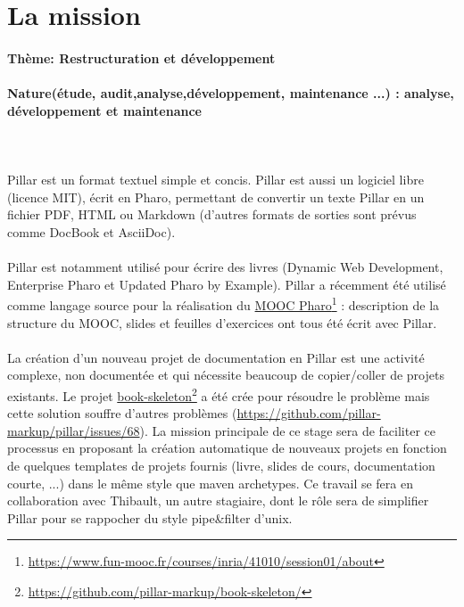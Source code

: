 \documentclass[french,twoside,openany,showtrims]{root/support/latex/sbabook/sbabook}
\newcommand\hrefnote[3][]{%
  \href{#2}{#3}\footnote{\url{#2} #1}}
\begin{document}
    \section{La mission}
      \paragraph{Thème: Restructuration et développement}

      \paragraph{Nature(étude, audit,analyse,développement, maintenance ...) : analyse, développement et maintenance}

      ~~\\
      ~~\\

      Pillar est un format textuel simple et concis. Pillar est aussi un logiciel
      libre (licence MIT), écrit en Pharo, permettant de convertir un texte Pillar
      en un fichier PDF, HTML ou Markdown (d'autres formats de sorties sont prévus
      comme DocBook et AsciiDoc).\\

      ~~\\

      Pillar est notamment utilisé pour écrire des livres (Dynamic Web Development,
      Enterprise Pharo et Updated Pharo by Example). Pillar a récemment été utilisé
      comme langage source pour la réalisation du \hrefnote{https://www.fun-mooc.fr/courses/inria/41010/session01/about}{MOOC Pharo} :
      description de la structure du MOOC, slides et feuilles d'exercices ont tous été écrit avec Pillar.\\

      ~~\\

      La création d'un nouveau projet de documentation en Pillar est une activité
      complexe, non documentée et qui nécessite beaucoup de copier/coller de projets
      existants. Le projet \hrefnote{https://github.com/pillar-markup/book-skeleton/}{book-skeleton}
      a été crée pour résoudre le problème mais cette solution souffre d'autres problèmes
      (\url{https://github.com/pillar-markup/pillar/issues/68}). La mission principale de ce
      stage sera de faciliter ce processus en proposant la création automatique de nouveaux
      projets en fonction de quelques templates de projets fournis (livre, slides de cours,
      documentation courte, ...) dans le même style que maven archetypes. Ce travail
      se fera en collaboration avec Thibault, un autre stagiaire, dont le rôle sera
      de simplifier Pillar pour se rappocher du style pipe\&filter d'unix.\\
\end{document}
